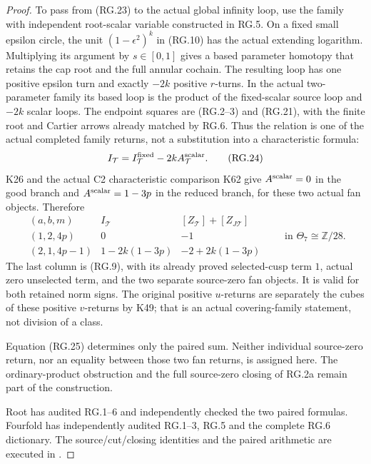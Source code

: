 \begin{proof}
To pass from (RG.23) to the actual global infinity loop,
use the family with independent root-scalar variable
constructed in RG.5. On a fixed small epsilon circle,
the unit \((1-\epsilon^2)^k\) in (RG.10) has the actual
extending logarithm. Multiplying its argument by
\(s\in[0,1]\) gives a based parameter homotopy that
retains the cap root and the full annular cochain.
The resulting loop has one positive epsilon turn and
exactly \(-2k\) positive \(r\)-turns. In the actual
two-parameter family its based loop is the product of
the fixed-scalar source loop and \(-2k\) scalar loops.
The endpoint squares are (RG.2--3) and (RG.21), with
the finite root and Cartier arrows already matched
by RG.6. Thus the relation is one of the actual
completed family returns, not a substitution into a
characteristic formula:
\[
             I_{\mathcal T}
                  =I^{\rm fixed}_{\mathcal T}
                         -2kA^{\rm scalar}_{\mathcal T}.
                                                        \tag{RG.24}
\]
K26 and the actual C2 characteristic comparison K62 give
\(A^{\rm scalar}=0\) in the good branch
and \(A^{\rm scalar}=1-3p\) in the reduced branch,
for these two actual fan objects. Therefore
\[
 \begin{array}{c|c|c}
 (a,b,m)&I_{\mathcal T}
                 &[Z_{\mathcal T}]+[Z_{J\mathcal T}]\\ \hline
 (1,2,4p)&0&-1\\
 (2,1,4p-1)&1-2k(1-3p)&-2+2k(1-3p)
 \end{array}
 \qquad\text{in }\Theta_7\cong\mathbb Z/28.             \tag{RG.25}
\]
The last column is (RG.9), with its already proved
selected-cusp term \(1\), actual zero unselected
term, and the two separate source-zero fan objects.
It is valid for both retained norm signs. The original
positive \(u\)-returns are separately the cubes of
these positive \(v\)-returns by K49; that is an actual
covering-family statement, not division of a class.

Equation (RG.25) determines only the paired sum.
Neither individual source-zero return, nor an equality
between those two fan returns, is assigned here.
The ordinary-product obstruction and the full
source-zero closing of RG.2a remain part of the
construction.

Root has audited RG.1--6 and independently checked
the two paired formulas. Fourfold has independently
audited RG.1--3, RG.5 and the complete RG.6 dictionary.
The source/cut/closing identities and the paired
arithmetic are executed in
.
\end{proof}
